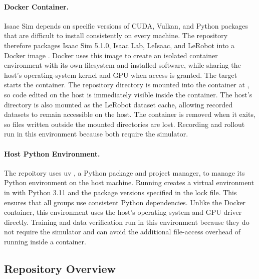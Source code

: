 \documentclass[11pt]{article}
\DeclareRobustCommand{\code}{\codeurl}  %
\begin{document}
\paragraph{Docker Container.} Isaac Sim depends on specific versions of CUDA, Vulkan, and Python packages that are difficult to install consistently on every machine. The repository therefore packages Isaac Sim 5.1.0, Isaac Lab, LeIsaac, and LeRobot into a Docker image \cite{docker2026}. Docker uses this image to create an isolated container environment with its own filesystem and installed software, while sharing the host's operating-system kernel and GPU when access is granted.
The \code{make launch-isaaclab} target starts the container. The repository directory is mounted into the container at , so code edited on the host is immediately visible inside the container. The host's  directory is also mounted as the LeRobot dataset cache, allowing recorded datasets to remain accessible on the host. The container is removed when it exits, so files written outside the mounted directories are lost. Recording and rollout run in this environment because both require the simulator.

\paragraph{Host Python Environment.} The repoitory uses uv \cite{uv}, a Python package and project manager, to manage its Python environment on the host machine. Running \code{uv sync} creates a virtual environment in  with Python 3.11 and the package versions specified in the lock file. This ensures that all groups use consistent Python dependencies.
Unlike the Docker container, this environment uses the host's operating system and GPU driver directly. Training and data verification run in this environment because they do not require the simulator and can avoid the additional file-access overhead of running inside a container.


\subsection{Repository Overview}
\label{sec:repo-overview}
\end{document}
